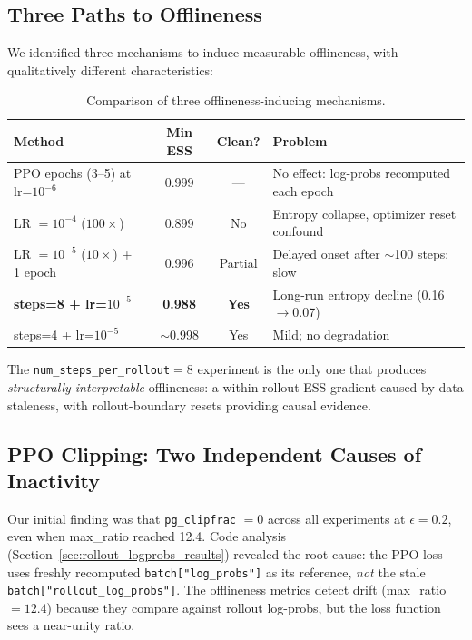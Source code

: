 \documentclass[11pt,a4paper]{article}
\begin{document}
\subsection{Three Paths to Offlineness}

We identified three mechanisms to induce measurable offlineness, with
qualitatively different characteristics:

\begin{table}[H]
\centering
\caption{Comparison of three offlineness-inducing mechanisms.}
\label{tab:three_paths}
\begin{tabular}{@{}p{3cm}ccp{4.5cm}@{}}
\toprule
\textbf{Method} & \textbf{Min ESS} & \textbf{Clean?} & \textbf{Problem} \\
\midrule
PPO epochs (3--5) at lr=$10^{-6}$ & 0.999 & --- & No effect: log-probs recomputed each epoch \\
LR $= 10^{-4}$ ($100\times$) & 0.899 & No & Entropy collapse, optimizer reset confound \\
LR $= 10^{-5}$ ($10\times$) + 1 epoch & 0.996 & Partial & Delayed onset after $\sim$100 steps; slow \\
\textbf{steps=8 + lr=$10^{-5}$} & \textbf{0.988} & \textbf{Yes} & Long-run entropy decline (0.16$\to$0.07) \\
steps=4 + lr=$10^{-5}$ & $\sim$0.998 & Yes & Mild; no degradation \\
\bottomrule
\end{tabular}
\end{table}

The \texttt{num\_steps\_per\_rollout}${}= 8$ experiment is the only one that
produces \emph{structurally interpretable} offlineness: a within-rollout ESS
gradient caused by data staleness, with rollout-boundary resets providing
causal evidence.

\subsection{PPO Clipping: Two Independent Causes of Inactivity}

Our initial finding was that \texttt{pg\_clipfrac} $= 0$ across all experiments
at $\epsilon = 0.2$, even when max\_ratio reached 12.4. Code analysis
(Section~\ref{sec:rollout_logprobs_results}) revealed the root cause: the PPO
loss uses freshly recomputed \texttt{batch["log\_probs"]} as its reference,
\emph{not} the stale \texttt{batch["rollout\_log\_probs"]}. The offlineness
metrics detect drift (max\_ratio $= 12.4$) because they compare against
rollout log-probs, but the loss function sees a near-unity ratio.
\end{document}

